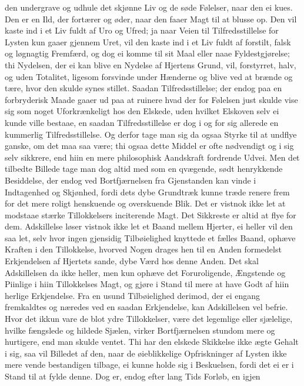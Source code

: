 \documentclass[12pt,a4paper]{book}
\newcommand{\apage}[1]{\marginnote{\footnotesize\textit{[#1]}}}
\begin{document}
den undergrave og udhule det skjønne Liv og de søde Følelser, naar den ei
kues. Den er en Ild, der fortærer og øder, naar den faaer Magt til at
blusse op. Den vil kaste ind i et Liv fuldt af Uro og Ufred; ja naar
Veien til Tilfredsstillelse for Lysten kun gaaer gjennem Uret, vil den
kaste ind i et Liv fuldt af forstilt, falsk og løgnagtig Fremfærd, og dog
ei komme til sit Maal eller naae Fyldestgjørelse; thi Nydelsen, der ei
kan blive en Nydelse af Hjertens Grund, vil, forstyrret, halv, og uden
Totalitet, ligesom forsvinde under Hænderne og blive ved at brænde og
tære, hvor den skulde synes stillet. Saadan Tilfredsstillelse; der endog
paa en forbryderisk Maade gaaer ud paa at ruinere hvad der for Følelsen
just skulde vise sig som noget Uforkrænkeligt hos den Elskede, uden
hvilket Elskoven selv ei kunde ville bestaae, en saadan Tilfredsstillelse
er dog i og for sig allerede en kummerlig \apage{161} Tilfredsstillelse. Og derfor
tage man sig da ogsaa Styrke til at undflye ganske, om det maa saa være;
thi ogsaa dette Middel er ofte nødvendigt og i sig selv sikkrere, end
hiin en mere philosophisk Aandskraft fordrende Udvei. Men det tilbedte
Billede tage man dog altid med som en qvægende, sødt henrykkende
Besiddelse, der endog ved Bortfjærnelsen fra Gjenstanden kan vinde i
Indtagenhed og Skjønhed, fordi dets dybe Grundtræk kunne træde renere
frem for det mere roligt henskuende og overskuende Blik. Det er vistnok
ikke let at modstaae stærke Tillokkelsers inciterende Magt. Det Sikkreste
er altid at flye for dem. Adskillelse løser vistnok ikke let et Baand
mellem Hjerter, ei heller vil den saa let, selv hvor ingen gjensidig
Tilbøielighed knyttede et fælles Baand, ophæve Kraften i den Tillokkelse,
hvorved Nogen drages hen til en Anden formedelst Erkjendelsen af Hjertets
sande, dybe Værd hos denne Anden. Det skal Adskillelsen da ikke heller,
men kun ophæve det Foruroligende, Ængstende og Piinlige i hiin
Tillokkelses Magt, og gjøre i Stand til mere at have Godt af hiin herlige
Erkjendelse. Fra en usund Tilbøielighed derimod, der ei engang
fremkaldtes og næredes ved en saadan Erkjendelse, kan Adskillelsen vel
befrie. Hvor det ikkun vare de blot ydre Tillokkelser, være det
legemlige eller sjælelige, hvilke fængslede og hildede Sjælen, virker
Bortfjærnelsen stundom mere og hurtigere, end man skulde ventet. \apage{162} Thi har
den elskede Skikkelse ikke ægte Gehalt i sig, saa vil Billedet af den,
naar de øieblikkelige Opfriskninger af Lysten ikke mere vende
bestandigen tilbage, ei kunne holde sig i Beskuelsen, fordi det ei er i
Stand til at fylde denne. Dog er, endog efter lang Tids Forløb, en igjen
\end{document}
